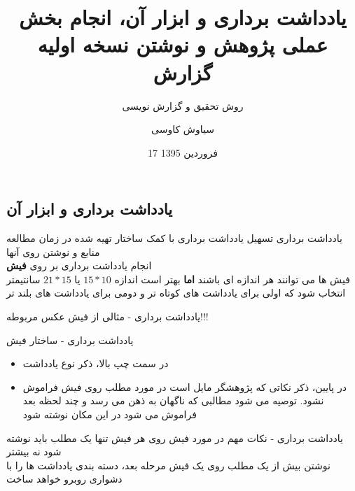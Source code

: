 \documentclass[14pt]{beamer}
\title{یادداشت برداری و ابزار آن، انجام بخش عملی پژوهش و نوشتن نسخه اولیه گزارش}
\subtitle{\color{brown} روش تحقیق و گزارش نویسی}
\date{17 فروردین 1395}
\author{سیاوش کاوسی}
\institute{دانشگاه صنعتی امیرکبیر}
\makeatletter
\newcommand{\rtlist}{\raggedleft\rightskip\@totalleftmargin}
\newcommand{\sectionfontsize}{\fontsize{22pt}{0pt}\selectfont}
\newcommand{\framefontsizelarge}{\fontsize{18pt}{0pt}\selectfont}
\newcommand{\frametitlefontsize}{\fontsize{20pt}{0pt}\selectfont}
\newcommand{\defaultvspace}{\vspace{5mm}}
\makeatother
\begin{document}
\begin{persian}
	\maketitle
	\everypar{\rightskip\rightmargin}		
	
	\section{\sectionfontsize یادداشت برداری و ابزار آن}	
	
	\begin{frame}{\frametitlefontsize یادداشت برداری}
		\framefontsizelarge
		تسهیل یادداشت برداری با کمک ساختار تهیه شده در زمان مطالعه منابع و نوشتن روی آنها \defaultvspace\\
		انجام یادداشت برداری بر روی \textbf{فیش}\defaultvspace\\
		فیش ها می توانند هر اندازه ای باشند  \textbf{اما} بهتر است اندازه  $15*10$ یا  $21*15$ سانتیمتر انتخاب شود که اولی برای یادداشت های کوتاه تر و دومی برای یادداشت های بلند تر
	\end{frame}	
	
	\begin{frame}{\frametitlefontsize یادداشت برداری - مثالی از فیش}
		\framefontsizelarge
		عکس مربوطه!!!
	\end{frame}	
	
	\begin{frame}{\frametitlefontsize یادداشت برداری - ساختار فیش}
		\framefontsizelarge
		
		\begin{itemize}\rtlist
			\item در سمت چپ بالا، ذکر نوع یادداشت  
			\defaultvspace\\
			\item در پایین، ذکر نکاتی که پژوهشگر مایل است در مورد مطلب روی فیش فراموش نشود. توصیه می شود مطالبی که ناگهان به ذهن می رسد و چند لحظه بعد فراموش می شود در این مکان نوشته شود
		\end{itemize}
	\end{frame}	
	
	\begin{frame}{\frametitlefontsize یادداشت برداری - نکات مهم در مورد فیش}
		\framefontsizelarge
		روی هر فیش تنها یک مطلب باید نوشته شود نه بیشتر\\
	   نوشتن بیش از یک مطلب روی یک فیش مرحله بعد، دسته بندی یادداشت ها را با دشواری روبرو خواهد ساخت\defaultvspace\\
	   

\end{frame}
\end{persian}
\end{document}
